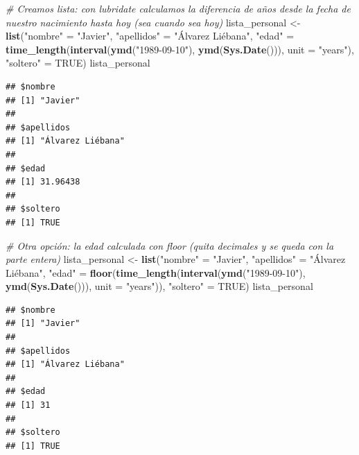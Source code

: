 \documentclass[11pt,]{book}
\newenvironment{Shaded}{\begin{snugshade}}{\end{snugshade}}
\newcommand{\CommentTok}[1]{\textcolor[rgb]{0.37,0.37,0.37}{\textit{#1}}}
\newcommand{\DataTypeTok}[1]{\textcolor[rgb]{0.27,0.27,0.27}{#1}}
\newcommand{\KeywordTok}[1]{\textcolor[rgb]{0.27,0.27,0.27}{\textbf{#1}}}
\newcommand{\NormalTok}[1]{#1}
\newcommand{\OtherTok}[1]{\textcolor[rgb]{0.37,0.37,0.37}{#1}}
\newcommand{\StringTok}[1]{\textcolor[rgb]{0.5,0.5,0.5}{#1}}
\begin{document}
\begin{Shaded}
\begin{Highlighting}[]
\CommentTok{# Creamos lista: con lubridate calculamos la diferencia de años desde la fecha de nuestro nacimiento hasta hoy (sea cuando sea hoy)}
\NormalTok{lista_personal <-}\StringTok{ }\KeywordTok{list}\NormalTok{(}\StringTok{"nombre"}\NormalTok{ =}\StringTok{ "Javier"}\NormalTok{,}
                       \StringTok{"apellidos"}\NormalTok{ =}\StringTok{ "Álvarez Liébana"}\NormalTok{,}
                       \StringTok{"edad"}\NormalTok{ =}\StringTok{ }\KeywordTok{time_length}\NormalTok{(}\KeywordTok{interval}\NormalTok{(}\KeywordTok{ymd}\NormalTok{(}\StringTok{"1989-09-10"}\NormalTok{), }\KeywordTok{ymd}\NormalTok{(}\KeywordTok{Sys.Date}\NormalTok{())), }\DataTypeTok{unit =} \StringTok{"years"}\NormalTok{),}
                       \StringTok{"soltero"}\NormalTok{ =}\StringTok{ }\OtherTok{TRUE}\NormalTok{)}
\NormalTok{lista_personal}
\end{Highlighting}
\end{Shaded}

\begin{verbatim}
## $nombre
## [1] "Javier"
## 
## $apellidos
## [1] "Álvarez Liébana"
## 
## $edad
## [1] 31.96438
## 
## $soltero
## [1] TRUE
\end{verbatim}

\begin{Shaded}
\begin{Highlighting}[]
\CommentTok{# Otra opción: la edad calculada con floor (quita decimales y se queda con la parte entera)}
\NormalTok{lista_personal <-}\StringTok{ }\KeywordTok{list}\NormalTok{(}\StringTok{"nombre"}\NormalTok{ =}\StringTok{ "Javier"}\NormalTok{,}
                       \StringTok{"apellidos"}\NormalTok{ =}\StringTok{ "Álvarez Liébana"}\NormalTok{,}
                       \StringTok{"edad"}\NormalTok{ =}\StringTok{ }\KeywordTok{floor}\NormalTok{(}\KeywordTok{time_length}\NormalTok{(}\KeywordTok{interval}\NormalTok{(}\KeywordTok{ymd}\NormalTok{(}\StringTok{"1989-09-10"}\NormalTok{), }\KeywordTok{ymd}\NormalTok{(}\KeywordTok{Sys.Date}\NormalTok{())), }\DataTypeTok{unit =} \StringTok{"years"}\NormalTok{)),}
                       \StringTok{"soltero"}\NormalTok{ =}\StringTok{ }\OtherTok{TRUE}\NormalTok{)}
\NormalTok{lista_personal}
\end{Highlighting}
\end{Shaded}

\begin{verbatim}
## $nombre
## [1] "Javier"
## 
## $apellidos
## [1] "Álvarez Liébana"
## 
## $edad
## [1] 31
## 
## $soltero
## [1] TRUE
\end{verbatim}
\end{document}
